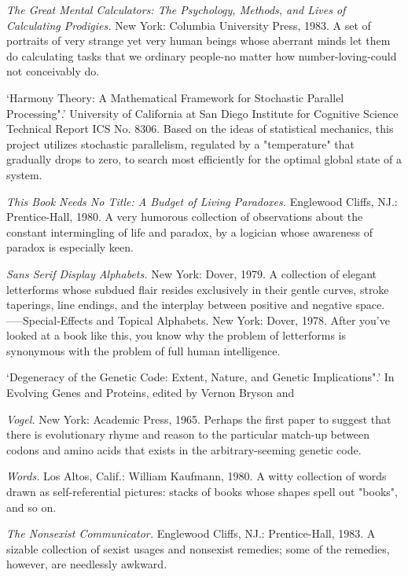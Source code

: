  {\sl The Great Mental Calculators: The Psychology, Methods, and Lives of Calculating Prodigies.} New York: Columbia University Press, 1983. A set of portraits of very strange yet very human beings whose aberrant minds let them do calculating tasks that we ordinary people-no matter how number-loving-could not conceivably do.

 `Harmony Theory: A Mathematical Framework for Stochastic Parallel Processing".' University of California at San Diego Institute for Cognitive Science Technical Report ICS No. 8306. Based on the ideas of statistical mechanics, this project utilizes stochastic parallelism, regulated by a "temperature" that gradually drops to zero, to search most efficiently for the optimal global state of a system.

 {\sl This Book Needs No Title: A Budget of Living Paradoxes.} Englewood Cliffs, NJ.: Prentice-Hall, 1980. A very humorous collection of observations about the constant intermingling of life and paradox, by a logician whose awareness of paradox is especially keen.

 {\sl Sans Serif Display Alphabets.} New York: Dover, 1979. A collection of elegant letterforms whose subdued flair resides exclusively in their gentle curves, stroke taperings, line endings, and the interplay between positive and negative space. -----Special-Effects and Topical Alphabets. New York: Dover, 1978. After you've looked at a book like this, you know why the problem of letterforms is synonymous with the problem of full human intelligence.

 `Degeneracy of the Genetic Code: Extent, Nature, and Genetic Implications".' In Evolving Genes and Proteins, edited by Vernon Bryson and

 {\sl Vogel.} New York: Academic Press, 1965. Perhaps the first paper to suggest that there is evolutionary rhyme and reason to the particular match-up between codons and amino acids that exists in the arbitrary-seeming genetic code.

 {\sl Words.} Los Altos, Calif.: William Kaufmann, 1980. A witty collection of words drawn as self-referential pictures: stacks of books whose shapes spell out "books", and so on.

 {\sl The Nonsexist Communicator.} Englewood Cliffs, NJ.: Prentice-Hall, 1983. A sizable collection of sexist usages and nonsexist remedies; some of the remedies, however, are needlessly awkward.

